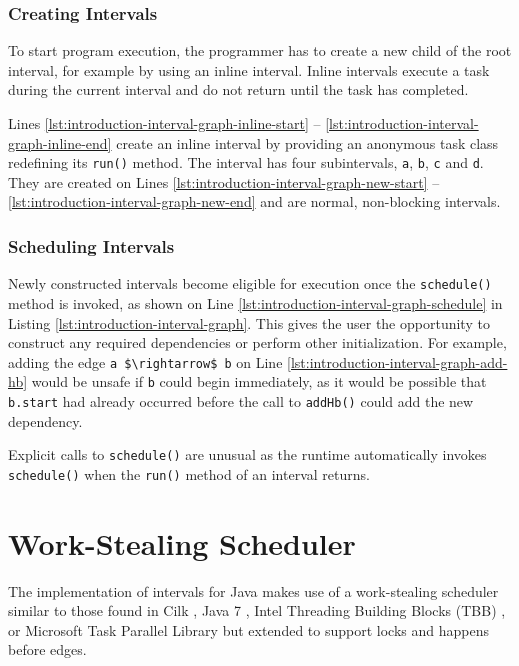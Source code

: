 \subsubsection{Creating Intervals}
\label{sec:intro-intervals-creating-intervals}

To start program execution, the programmer has to create a new child
of the root interval, for example by using an inline interval. Inline
intervals execute a task during the current interval and do not return
until the task has completed.

Lines \ref{lst:introduction-interval-graph-inline-start} --
\ref{lst:introduction-interval-graph-inline-end} create an inline interval by
providing an anonymous task class redefining its \lstinline!run()!
method. The interval has four subintervals, \lstinline!a!,
\lstinline!b!, \lstinline!c! and \lstinline!d!. They are created on
Lines \ref{lst:introduction-interval-graph-new-start} --
\ref{lst:introduction-interval-graph-new-end} and are normal, non-blocking
intervals.

\subsubsection{Scheduling Intervals}
\label{sec:intro-intervals-scheduling-intervals}

Newly constructed intervals become eligible for execution once the
\lstinline!schedule()! method is invoked, as shown on Line
\ref{lst:introduction-interval-graph-schedule} in Listing
\ref{lst:introduction-interval-graph}. This gives the user the opportunity to
construct any required dependencies or perform other
initialization. For example, adding the edge
\lstinline!a $\rightarrow$ b! on Line \ref{lst:introduction-interval-graph-add-hb}
would be unsafe if \lstinline!b! could begin immediately, as it would
be possible that \lstinline!b.start! had already occurred before the
call to \lstinline!addHb()! could add the new dependency.

Explicit calls to \lstinline!schedule()! are unusual as the runtime
automatically invokes \lstinline!schedule()! when the
\lstinline!run()! method of an interval returns.


\section{Work-Stealing Scheduler}
\label{sec:intro-work-stealing-scheduler}

The implementation of intervals for Java makes use of a work-stealing
scheduler similar to those found in Cilk \cite{Blumofe1995,
  Frigo1998}, Java 7 \cite{Lea2000, Lea2000a, Lea2004, Lea2006}, Intel
Threading Building Blocks (TBB) \cite{Reinders2007, Contreras2008}, or
Microsoft Task Parallel Library \cite{Leijen2009} but extended to
support locks and happens before edges.

